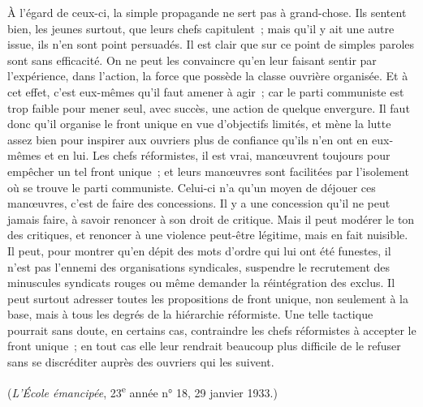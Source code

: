 \documentclass[french,twoside]{book} %
\begin{document}
À l'égard de ceux-ci, la simple propagande ne sert pas à grand-chose. Ils sentent bien, les jeunes surtout, que leurs chefs capitulent ; mais qu'il y ait une autre issue, ils n'en sont point persuadés. Il est clair que sur ce point de simples paroles sont sans efficacité. On ne peut les convaincre qu'en leur faisant sentir par l'expérience, dans l'action, la force que possède la classe ouvrière organisée. Et à cet effet, c'est eux-mêmes qu'il faut amener à agir ; car le parti communiste est trop faible pour mener seul, avec succès, une action de quelque envergure. Il faut donc qu'il organise le front unique en vue d'objectifs limités, et mène la lutte assez bien pour inspirer aux ouvriers plus de confiance qu'ils n'en ont en eux-mêmes et en lui. Les chefs réformistes, il est vrai, manœuvrent toujours pour empêcher un tel front unique ; et leurs manœuvres sont facilitées par l'isolement où se trouve le parti communiste. Celui-ci n'a qu'un moyen de déjouer ces manœuvres, c'est de faire des concessions. Il y a une concession qu'il ne peut jamais faire, à savoir renoncer à son droit de critique. Mais il peut modérer le ton des critiques, et renoncer à une violence peut-être légitime, mais en fait nuisible. Il peut, pour montrer qu'en dépit des mots d'ordre qui lui ont été funestes, il n'est pas l'ennemi des organisations syndicales, suspendre le recrutement des minuscules syndicats rouges ou même demander la réintégration des exclus. Il peut surtout adresser toutes les propositions de front unique, non seulement à la base, mais à tous les degrés de la hiérarchie réformiste. Une telle tactique pourrait sans doute, en certains cas, contraindre les chefs réformistes à accepter le front unique ; en tout cas elle leur rendrait beaucoup plus difficile de le refuser sans se discréditer auprès des ouvriers qui les suivent.\par
({\itshape L'École émancipée}, 23\textsuperscript{e} année n° 18, 29 janvier 1933.)
\end{document}

